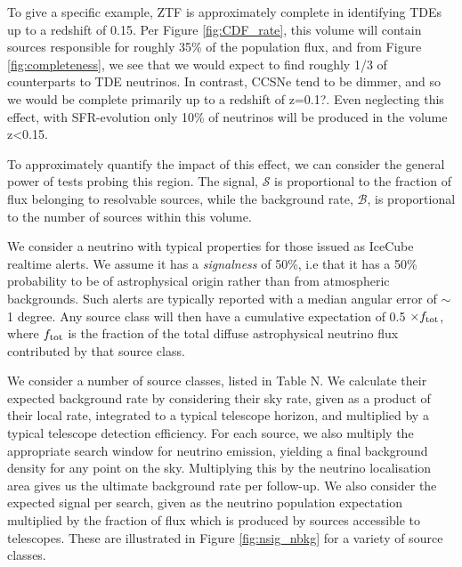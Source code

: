 To give a specific example, ZTF is approximately complete in identifying TDEs up to a redshift of 0.15. Per Figure \ref{fig:CDF_rate}, this volume will contain sources responsible for roughly 35\% of the population flux, and from Figure \ref{fig:completeness}, we see that we would expect to find roughly 1/3 of counterparts to TDE neutrinos. In contrast, CCSNe tend to be dimmer, and so we would be complete primarily up to a redshift of z=0.1?. Even neglecting this effect, with SFR-evolution only 10\% of neutrinos will be produced in the volume z<0.15.

To approximately quantify the impact of this effect, we can consider the general power of tests probing this region. The signal, $\mathcal{S}$ is proportional to the fraction of flux belonging to resolvable sources, while the background rate, $\mathcal{B}$, is proportional to the number of sources within this volume.

We consider a neutrino with typical properties for those issued as IceCube realtime alerts. We assume it has a \emph{signalness} of 50\%, i.e that it has a 50\% probability to be of astrophysical origin rather than from atmospheric backgrounds. Such alerts are typically reported with a median angular error of $\sim$1 degree. Any source class will then have a cumulative expectation of 0.5 $\times f_{\textup{tot}}$, where $f_{\textup{tot}}$ is the fraction of the total diffuse astrophysical neutrino flux contributed by that source class. 
		
We consider a number of source classes, listed in Table N. We calculate their expected background rate by considering their sky rate, given as a product of their local rate, integrated to a typical telescope horizon, and multiplied by a typical telescope detection efficiency. For each source, we also multiply the appropriate search window for neutrino emission, yielding a final background density for any point on the sky. Multiplying this by the neutrino localisation area gives us the ultimate background rate per follow-up. We also consider the expected signal per search, given as the neutrino population expectation multiplied by the fraction of flux which is produced by sources accessible to telescopes.  These are illustrated in Figure \ref{fig:nsig_nbkg} for a variety of source classes.

